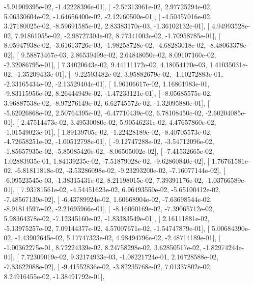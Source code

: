 \documentclass{article}
\begin{document}
         -5.91909395e-02,  -1.42228396e-01],
       [ -2.57313961e-02,   2.97725294e-02,   5.06330604e-02,
         -1.64656400e-02,  -2.12760500e-01],
       [ -4.50457016e-02,   3.27180025e-02,  -8.59691585e-02,
          2.83383170e-03,  -1.36102132e-01],
       [  4.94993528e-02,   7.91861055e-02,  -2.98727304e-02,
          8.77341003e-02,  -1.70958785e-01],
       [  8.05947938e-02,  -3.61613726e-03,  -1.98258728e-02,
         -4.68283018e-02,  -8.48063378e-02],
       [  9.58873467e-03,   2.86539499e-02,   2.64848050e-02,
          8.09107160e-02,  -2.32086795e-01],
       [  7.34020643e-02,   9.44111172e-02,   4.18054170e-03,
          1.41035031e-02,  -1.35209433e-01],
       [ -9.22593482e-02,   3.95882679e-02,  -1.10272883e-01,
         -2.33165434e-02,  -2.13529404e-01],
       [  1.96106617e-02,   1.16801983e-01,  -9.83115956e-02,
          8.26444949e-02,  -1.47233121e-01],
       [ -8.05685575e-02,   3.96887538e-02,  -8.97276149e-02,
          6.62745572e-02,  -1.32095880e-01],
       [ -5.62026868e-02,   2.50764395e-02,  -6.47710439e-02,
          6.78108450e-02,  -2.60204085e-01],
       [  2.47514473e-02,   3.49530080e-02,   5.90546231e-02,
          4.47657860e-02,  -1.01549023e-01],
       [  1.89139705e-02,  -1.22428189e-02,  -8.40705573e-02,
         -4.72658251e-02,  -1.00512798e-01],
       [ -9.12747288e-02,  -3.54712096e-02,  -1.85657935e-02,
         -5.85085420e-02,  -8.06505002e-02],
       [ -7.41532665e-02,   1.02883935e-01,   1.84139235e-02,
         -7.51879028e-02,  -9.62860840e-02],
       [  1.76761581e-02,  -6.81811818e-02,  -3.53286098e-02,
         -9.23293200e-02,  -7.16077144e-02],
       [ -6.09523545e-03,  -1.38315431e-02,   8.21198015e-02,
          7.39391176e-02,  -1.03766589e-01],
       [  7.93781561e-02,  -4.54451623e-02,   6.96493550e-02,
         -5.65100412e-02,  -7.48567139e-02],
       [ -6.43789924e-02,   1.60668904e-02,  -7.63698544e-02,
         -8.91814597e-02,  -2.21695966e-01],
       [ -8.16060169e-02,  -7.39065712e-02,   5.98364378e-02,
         -7.12345160e-02,  -1.83383549e-01],
       [  2.16111881e-02,  -5.13975257e-02,   7.09144377e-02,
          4.57007671e-02,  -1.54747879e-01],
       [  5.00684390e-02,  -1.43902645e-02,   5.17747323e-02,
          4.98494796e-02,  -2.48714189e-01],
       [ -1.00362275e-01,   8.72224339e-02,   8.24758298e-02,
          3.62850517e-02,  -1.82974244e-01],
       [  7.72309019e-02,   9.32174933e-03,  -1.08221724e-01,
          2.16728588e-02,  -7.83622088e-02],
       [ -9.41552836e-02,  -3.82235768e-02,   7.01337802e-02,
          8.24916455e-02,  -1.38491792e-01],
\end{document}
